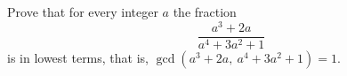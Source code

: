 Prove that for every integer $a$ the fraction
\[
\dfrac{a^3+2a}{a^4+3a^2+1}
\]
is in lowest terms, that is, $\gcd\left(a^3+2a,\ a^4+3a^2+1\right)=1$.
